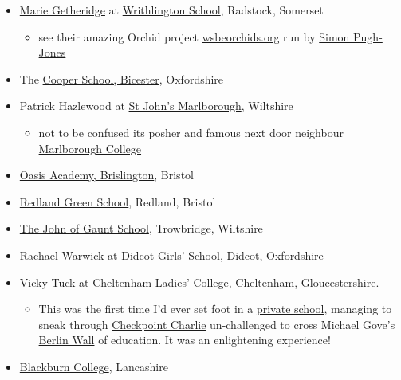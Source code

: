 \documentclass[
]{book}
\providecommand{\tightlist}{%
  \setlength{\itemsep}{0pt}\setlength{\parskip}{0pt}}
\begin{document}
\begin{itemize}
\tightlist
\item
  \href{https://wessexlearningtrust.co.uk/teammembers/marie-getheridge/}{Marie Getheridge} at \href{https://en.wikipedia.org/wiki/Writhlington_School}{Writhlington School}, Radstock, Somerset

  \begin{itemize}
  \tightlist
  \item
    see their amazing Orchid project \href{https://wsbeorchids.org/thirty-years-of-the-writhlington-schools-orchid-project-a-teachers-view-by-simon-pugh-jones/}{wsbeorchids.org} run by \href{https://www.bristol.ac.uk/graduation/honorary-degrees/honorary-graduates-2019/simon-pugh-jones/}{Simon Pugh-Jones}
  \end{itemize}
\item
  The \href{https://en.wikipedia.org/wiki/Cooper_School,_Bicester}{Cooper School, Bicester}, Oxfordshire
\item
  Patrick Hazlewood at \href{https://en.wikipedia.org/wiki/St_John\%27s_Marlborough}{St John's Marlborough}, Wiltshire

  \begin{itemize}
  \tightlist
  \item
    not to be confused its posher and famous next door neighbour \href{https://en.wikipedia.org/wiki/Marlborough_College}{Marlborough College}
  \end{itemize}
\item
  \href{https://en.wikipedia.org/wiki/Oasis_Academy_Brislington}{Oasis Academy, Brislington}, Bristol
\item
  \href{https://en.wikipedia.org/wiki/Redland_Green_School}{Redland Green School}, Redland, Bristol
\item
  \href{https://en.wikipedia.org/wiki/The_John_of_Gaunt_School}{The John of Gaunt School}, Trowbridge, Wiltshire
\item
  \href{https://twitter.com/rachaelwarwick7}{Rachael Warwick} at \href{https://en.wikipedia.org/wiki/Didcot_Girls\%27_School}{Didcot Girls' School}, Didcot, Oxfordshire
\item
  \href{http://news.bbc.co.uk/local/gloucestershire/hi/people_and_places/newsid_8741000/8741279.stm}{Vicky Tuck} at \href{https://en.wikipedia.org/wiki/Cheltenham_Ladies\%27_College}{Cheltenham Ladies' College}, Cheltenham, Gloucestershire.

  \begin{itemize}
  \tightlist
  \item
    This was the first time I'd ever set foot in a \href{https://en.wikipedia.org/wiki/Independent_school_(United_Kingdom)}{private school}, managing to sneak through \href{https://en.wikipedia.org/wiki/Checkpoint_Charlie}{Checkpoint Charlie} un-challenged to cross Michael Gove's \href{https://en.wikipedia.org/wiki/Berlin_Wall}{Berlin Wall} of education. It was an enlightening experience! \citep{berlinwall, cheltenham}
  \end{itemize}
\item
  \href{https://en.wikipedia.org/wiki/Blackburn_College,_Lancashire}{Blackburn College}, Lancashire


\end{itemize}
\end{document}
